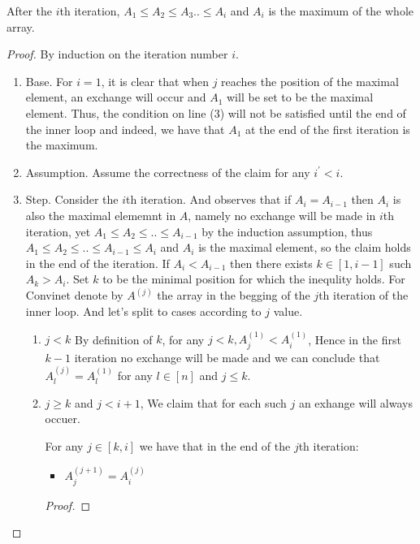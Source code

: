 \begin{claim}
  After the $i$th iteration, $A_{1} \le A_{2} \le A_{3} .. \le A_{i}$ and $A_{i}$ is the maximum of the whole array. 
\end{claim}
\begin{proof}
  By induction on the iteration number $i$. 
  \begin{enumerate}
    \item Base. For $i=1$, it is clear that when $j$ reaches the position of the maximal element, an exchange will occur and $A_{1}$ will be set to be the maximal element. Thus, the condition on line (3) will not be satisfied until the end of the inner loop and indeed, we have that $A_{1}$ at the end of the first iteration is the maximum.
    \item Assumption. Assume the correctness of the claim for any $i^{\prime} < i$. 
    \item Step. Consider the $i$th iteration. And observes that if $A_{i} = A_{i-1}$ then $A_{i}$ is also the maximal elememnt in $A$, namely no exchange will be made in $i$th iteration, yet $A_{1} \le A_{2} \le .. \le A_{i-1}$ by the induction assumption, thus  $A_{1} \le A_{2} \le .. \le A_{i-1} \le A_{i}$ and $A_{i}$ is the maximal element, so the claim holds in the end of the iteration. 
      If $A_{i} < A_{i-1}$ then there exists $k \in [1,i-1]$ such $A_{k} > A_{i}$. Set $k$ to be the minimal position for which the inequlity holds. For Convinet denote by $A^{(j)}$ the array in the begging of the $j$th iteration of the inner loop. And let's split to cases according to $j$ value. 
      \begin{enumerate}
        \item $j < k$ By definition of $k$, for any $j < k, A^{(1)}_{j} < A^{(1)}_{i}$, Hence in the first $k-1$ iteration no exchange will be made and we can conclude that $A^{(j)}_{l} = A^{(1)}_{l}$ for any $l \in [n]$ and $j \le k$. 
        \item $j \ge k$ and $j<i+1$, We claim that for each such $j$ an exhange will always occuer. 
          \begin{claim}
            For any $j \in [k,i]$ we have that in the end of the $j$th iteration:  
            \begin{itemize}
              \item $A^{(j+1)}_{j} = A^{(j)}_{i}$
            \end{itemize}
          \end{claim}
          \begin{proof}

\end{proof}
\end{enumerate}
\end{enumerate}
\end{proof}
